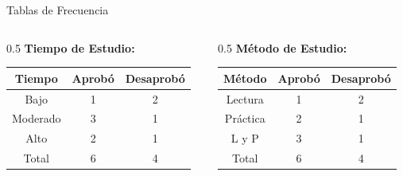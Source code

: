 \documentclass{beamer}
\begin{document}
\begin{frame}{Tablas de Frecuencia}
    \begin{columns}
        \begin{column}{0.5\textwidth}
            \textbf{Tiempo de Estudio:}
            \begin{table}
                \centering
                \begin{tabular}{ccc}
                    \toprule
                    Tiempo & Aprobó & Desaprobó \\
                    \midrule
                    Bajo & 1 & 2 \\
                    Moderado & 3 & 1 \\
                    Alto & 2 & 1 \\
                    \midrule
                    Total & 6 & 4 \\
                    \bottomrule
                \end{tabular}
            \end{table}
        \end{column}
        \begin{column}{0.5\textwidth}
            \textbf{Método de Estudio:}
            \begin{table}
                \centering
                \begin{tabular}{ccc}
                    \toprule
                    Método & Aprobó & Desaprobó \\
                    \midrule
                    Lectura & 1 & 2 \\
                    Práctica & 2 & 1 \\
                    L y P & 3 & 1 \\
                    \midrule
                    Total & 6 & 4 \\
                    \bottomrule
                \end{tabular}
            \end{table}
        \end{column}
    \end{columns}
\end{frame}
\end{document}
